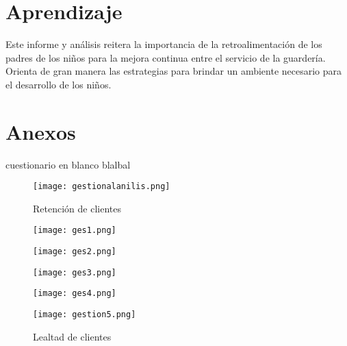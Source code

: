 \documentclass[letterpaper,12pt]{article}
\begin{document}
\begin{sloppypar}
\section{Aprendizaje}
Este informe y análisis reitera la importancia de la retroalimentación de los padres de los niños para la mejora continua entre el servicio de la guardería. Orienta de gran manera las estrategias para brindar un ambiente necesario para el desarrollo de los niños.

\section{Anexos}
cuestionario en blanco blalbal
\begin{figure}[H]
  \centering 
  \texttt{[image: gestionalanilis.png]}
  \caption{Retención de clientes}
\end{figure}
\begin{figure}[H]
  \centering 
  \texttt{[image: ges1.png]}
\end{figure}
\begin{figure}[H]
  \centering 
  \texttt{[image: ges2.png]}
\end{figure}
\begin{figure}[H]
  \centering 
  \texttt{[image: ges3.png]}
\end{figure}
\begin{figure}[H]
  \centering 
  \texttt{[image: ges4.png]}
\end{figure}
\begin{figure}[H]
  \centering 
  \texttt{[image: gestion5.png]}
  \caption{Lealtad de clientes}
\end{figure}

\end{sloppypar}
\end{document}
